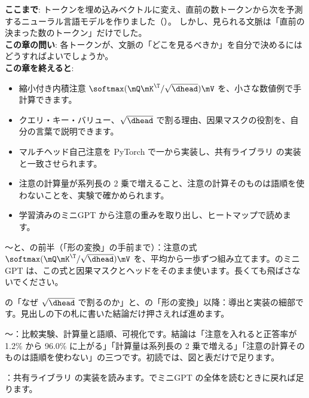 \begin{chapterlead}
\textbf{ここまで}: トークンを埋め込みベクトルに変え、直前の数トークンから次を予測するニューラル言語モデルを作りました（）。
しかし、見られる文脈は「直前の決まった数のトークン」だけでした。\\[1mm]
\textbf{この章の問い}: 各トークンが、文脈の「どこを見るべきか」を自分で決めるにはどうすればよいでしょうか。\\[1mm]
\textbf{この章を終えると}:
\begin{itemize}
\item 縮小付き内積注意 $\softmax(\mQ\mK^\T/\sqrt{\dhead})\mV$ を、小さな数値例で手計算できます。
\item クエリ・キー・バリュー、$\sqrt{\dhead}$ で割る理由、因果マスクの役割を、自分の言葉で説明できます。
\item マルチヘッド自己注意を PyTorch で一から実装し、共有ライブラリ  の実装と一致させられます。
\item 注意の計算量が系列長の 2 乗で増えること、注意の計算そのものは語順を使わないことを、実験で確かめられます。
\item 学習済みのミニGPT から注意の重みを取り出し、ヒートマップで読めます。
\end{itemize}
\end{chapterlead}

\begin{readingguide}
\item[\rgmust] 〜と、の前半（「形の変換」の手前まで）：注意の式 $\softmax(\mQ\mK^\T/\sqrt{\dhead})\mV$ を、平均から一歩ずつ組み立てます。のミニGPT は、この式と因果マスクとヘッドをそのまま使います。長くても飛ばさないでください。
\item[\rgskim] の「なぜ $\sqrt{\dhead}$ で割るのか」と、の「形の変換」以降：導出と実装の細部です。見出しの下の札に書いた結論だけ押さえれば進めます。
\item[\rgskim] 〜：比較実験、計算量と語順、可視化です。結論は「注意を入れると正答率が 1.2\% から 96.0\% に上がる」「計算量は系列長の 2 乗で増える」「注意の計算そのものは語順を使わない」の三つです。初読では、図と表だけで足ります。
\item[\rglater] ：共有ライブラリ  の実装を読みます。でミニGPT の全体を読むときに戻れば足ります。
\end{readingguide}

